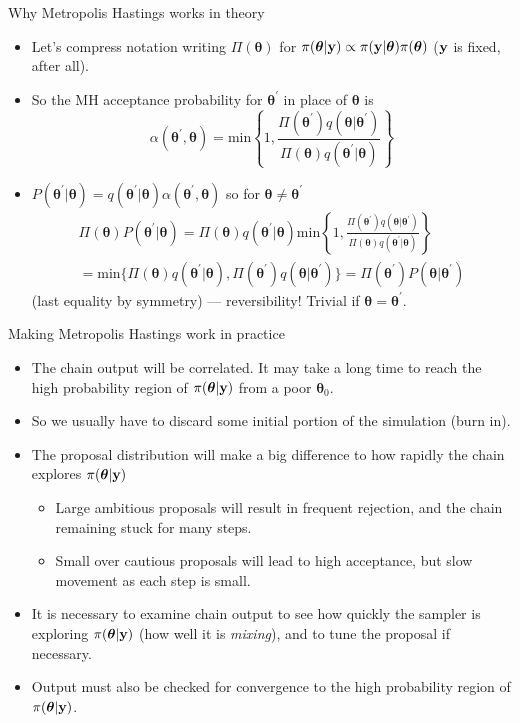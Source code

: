 \documentclass{beamer}
\begin{document}
\begin{frame}{Why Metropolis Hastings works in theory}
\begin{itemize}
\item Let's compress notation writing $\Pi({\bm \theta})$ for $\pi({\bm \theta}|{\bf y}) \propto \pi({\bf y}|{\bm \theta})\pi({\bm \theta})$ ($\bf y$ is fixed, after all).
\item So the MH acceptance probability for ${\bm \theta}^\prime$ in place of ${\bm \theta}$ is 
$$
\alpha({\bm \theta}^\prime,{\bm \theta}) = \text{min} \left \{1, 
\frac{\Pi({\bm \theta}^\prime)q({\bm \theta}|{\bm \theta}^\prime)}{ \Pi({\bm \theta})q({\bm \theta}^\prime|{\bm \theta})}
\right \}
$$
\item $P({\bm \theta}^\prime|{\bm \theta}) = q({\bm \theta}^\prime|{\bm \theta})\alpha({\bm \theta}^\prime,{\bm \theta})$ so for ${\bm \theta} \ne {\bm \theta}^\prime$
\begin{multline*}
\Pi({\bm \theta})P({\bm \theta}^\prime|{\bm \theta}) = \Pi({\bm \theta})q({\bm \theta}^\prime|{\bm \theta})\text{min} \left \{1,\frac{ 
\Pi({\bm \theta}^\prime)q({\bm \theta}|{\bm \theta}^\prime)}{ \Pi({\bm \theta})q({\bm \theta}^\prime|{\bm \theta}) } \right \} \\ = \text{min} \{ \Pi({\bm \theta})q({\bm \theta}^\prime|{\bm \theta}),
\Pi({\bm \theta}^\prime)q({\bm \theta}|{\bm \theta}^\prime) \} = \Pi({\bm \theta}^\prime)P({\bm \theta}|{\bm \theta}^\prime)
\end{multline*}
(last equality by symmetry) --- reversibility! Trivial if ${\bm \theta} ={\bm \theta}^\prime$.
\end{itemize}
\end{frame}

\begin{frame}{Making Metropolis Hastings work in practice}
\begin{itemize}
\item The chain output will be correlated. It may take a long time to reach the high probability region of $\pi({\bm \theta}|{\bf y})$ from a poor ${\bm \theta}_0$.
\item So we usually have to discard some initial portion of the simulation (burn in).
\item The proposal distribution will make a big difference to how rapidly the chain explores  $\pi({\bm \theta}|{\bf y})$
\begin{itemize}
\item Large ambitious proposals will result in frequent rejection, and the chain remaining stuck for many steps.
\item Small over cautious proposals will lead to high acceptance, but slow movement as each step is small. 
\end{itemize} 
\item It is necessary to examine chain output to see how quickly the sampler is exploring $\pi({\bm \theta}|{\bf y})$ (how well it is {\em mixing}), and to tune the proposal if necessary.
\item Output must also be checked for convergence to the high probability region of $\pi({\bm \theta}|{\bf y})$.
\end{itemize}
\end{frame}
\end{document}
